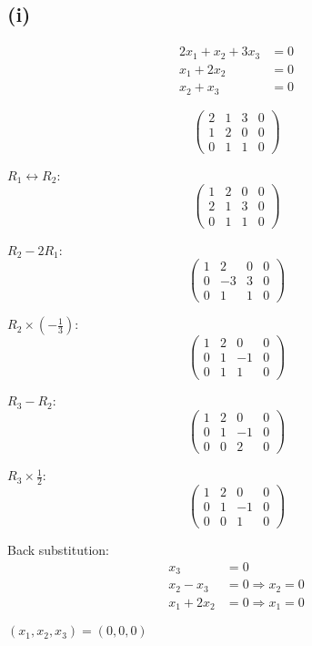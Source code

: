 \subsection*{(i)}
\begin{align*}
	2x_1 + x_2 + 3x_3 & = 0 \\
	x_1 + 2x_2        & = 0 \\
	x_2 + x_3         & = 0
\end{align*}

\[
	\left(\begin{array}{ccc|c}
			2 & 1 & 3 & 0 \\
			1 & 2 & 0 & 0 \\
			0 & 1 & 1 & 0
		\end{array}\right)
\]

$R_1 \leftrightarrow R_2$:
\[
	\left(\begin{array}{ccc|c}
			1 & 2 & 0 & 0 \\
			2 & 1 & 3 & 0 \\
			0 & 1 & 1 & 0
		\end{array}\right)
\]

$R_2 - 2R_1$:
\[
	\left(\begin{array}{ccc|c}
			1 & 2  & 0 & 0 \\
			0 & -3 & 3 & 0 \\
			0 & 1  & 1 & 0
		\end{array}\right)
\]

$R_2 \times (-\frac{1}{3})$:
\[
	\left(\begin{array}{ccc|c}
			1 & 2 & 0  & 0 \\
			0 & 1 & -1 & 0 \\
			0 & 1 & 1  & 0
		\end{array}\right)
\]

$R_3 - R_2$:
\[
	\left(\begin{array}{ccc|c}
			1 & 2 & 0  & 0 \\
			0 & 1 & -1 & 0 \\
			0 & 0 & 2  & 0
		\end{array}\right)
\]

$R_3 \times \frac{1}{2}$:
\[
	\left(\begin{array}{ccc|c}
			1 & 2 & 0  & 0 \\
			0 & 1 & -1 & 0 \\
			0 & 0 & 1  & 0
		\end{array}\right)
\]

Back substitution:
\begin{align*}
	x_3 &= 0 \\
	x_2 - x_3 &= 0 \Rightarrow x_2 = 0 \\
	x_1 + 2x_2 &= 0 \Rightarrow x_1 = 0
\end{align*}

$\boxed{(x_1, x_2, x_3) = (0, 0, 0)}$